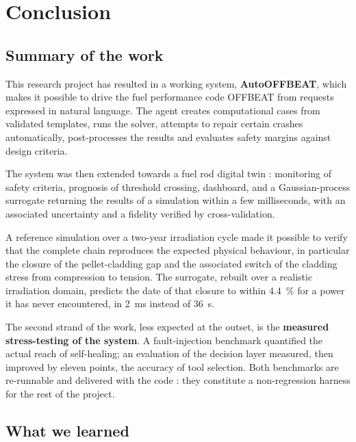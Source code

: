 \chapter*{Conclusion}

\section*{Summary of the work}

This research project has resulted in a working system, \textbf{AutoOFFBEAT},
which makes it possible to drive the fuel performance code OFFBEAT from requests
expressed in natural language. The agent creates computational cases from
validated templates, runs the solver, attempts to repair certain crashes
automatically, post-processes the results and evaluates safety margins against
design criteria.

The system was then extended towards a fuel rod digital twin : monitoring of
safety criteria, prognosis of threshold crossing, dashboard, and a
Gaussian-process surrogate returning the results of a simulation within a few
milliseconds, with an associated uncertainty and a fidelity verified by
cross-validation.

A reference simulation over a two-year irradiation cycle made it possible to
verify that the complete chain reproduces the expected physical behaviour, in
particular the closure of the pellet-cladding gap and the associated switch of
the cladding stress from compression to tension. The surrogate, rebuilt over a
realistic irradiation domain, predicts the date of that closure to within
\SI{4.4}{\percent} for a power it has never encountered, in \SI{2}{\milli\second}
instead of \SI{36}{\second}.

The second strand of the work, less expected at the outset, is the
\textbf{measured stress-testing of the system}. A fault-injection benchmark
quantified the actual reach of self-healing; an evaluation of the decision layer
measured, then improved by eleven points, the accuracy of tool selection. Both
benchmarks are re-runnable and delivered with the code : they constitute a
non-regression harness for the rest of the project.

\section*{What we learned}

